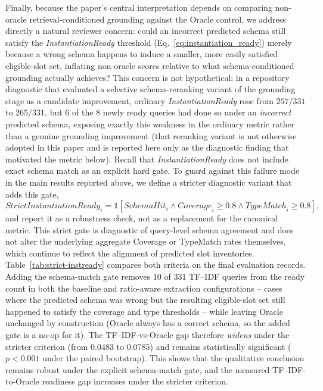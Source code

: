 \documentclass[pdflatex,sn-basic,Numbered]{sn-jnl}
\begin{document}
Finally, because the paper's central interpretation depends on comparing non-oracle retrieval-conditioned grounding against the Oracle control, we address directly a natural reviewer concern: could an incorrect predicted schema still satisfy the \textit{InstantiationReady} threshold (Eq.~\eqref{eq:instantiation_ready}) merely because a wrong schema happens to induce a smaller, more easily satisfied eligible-slot set, inflating non-oracle scores relative to what schema-conditioned grounding actually achieves? This concern is not hypothetical: in a repository diagnostic that evaluated a selective schema-reranking variant of the grounding stage as a candidate improvement, ordinary \textit{InstantiationReady} rose from $257/331$ to $265/331$, but $6$ of the $8$ newly ready queries had done so under an \emph{incorrect} predicted schema, exposing exactly this weakness in the ordinary metric rather than a genuine grounding improvement (that reranking variant is not otherwise adopted in this paper and is reported here only as the diagnostic finding that motivated the metric below). Recall that \textit{InstantiationReady} does not include exact schema match as an explicit hard gate. To guard against this failure mode in the main results reported above, we define a stricter diagnostic variant that adds this gate,
\begin{equation}
\mathit{StrictInstantiationReady}_i = \mathbb{1}\!\left[\mathit{SchemaHit}_i \wedge \mathit{Coverage}_i \geq 0.8 \wedge \mathit{TypeMatch}_i \geq 0.8\right],
\label{eq:strict_instantiation_ready}
\end{equation}
and report it as a robustness check, not as a replacement for the canonical metric. This strict gate is diagnostic of query-level schema agreement and does not alter the underlying aggregate Coverage or TypeMatch rates themselves, which continue to reflect the alignment of predicted slot inventories. Table~\ref{tab:strict-instready} compares both criteria on the final evaluation records. Adding the schema-match gate removes 10 of 331 TF--IDF queries from the ready count in both the baseline and ratio-aware extraction configurations -- cases where the predicted schema was wrong but the resulting eligible-slot set still happened to satisfy the coverage and type thresholds -- while leaving Oracle unchanged by construction (Oracle always has a correct schema, so the added gate is a no-op for it). The TF--IDF-vs-Oracle gap therefore \emph{widens} under the stricter criterion (from $0.0483$ to $0.0785$) and remains statistically significant ($p<0.001$ under the paired bootstrap). This shows that the qualitative conclusion remains robust under the explicit schema-match gate, and the measured TF--IDF-to-Oracle readiness gap increases under the stricter criterion.
\end{document}
